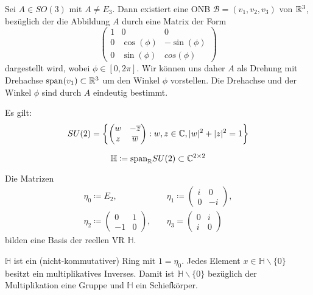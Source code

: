 \documentclass{cheat-sheet}
\newcommand{\HH}{\mathbb{H}}
\newcommand{\BB}{\mathcal{B}}
\begin{document}
\begin{satz}
Sei $A \in SO(3)$ mit $A \not= E_3$. Dann existiert eine ONB $\BB = (v_1, v_2, v_3)$ von $\mathbb{R}^3$, bezüglich der die Abbildung $A$ durch eine Matrix der Form
\[ \begin{pmatrix}
1 & 0 & 0 \\
0 & \cos(\phi) & - \sin(\phi) \\
0 & \sin(\phi) & cos(\phi)
\end{pmatrix} \]
dargestellt wird, wobei $\phi \in [0, 2 \pi]$. Wir können uns daher $A$ als Drehung mit Drehachse $\mathrm{span}(v_1) \subset \mathbb{R}^3$ um den Winkel $\phi$ vorstellen. Die Drehachse und der Winkel $\phi$ sind durch $A$ eindeutig bestimmt.
\end{satz}


\begin{satz}
Es gilt:
\[ SU(2) = \left\{ \begin{pmatrix}
w & - \overline{z} \\
z & \overline{w}
\end{pmatrix} : w, z \in \mathbb{C}, |w|^2 + |z|^2 = 1 \right\} \]
\end{satz}

\begin{definition}
\[ \HH \coloneqq \mathrm{span}_{\R} SU(2) \subset \C^{2 \times 2} \]
\end{definition}

\begin{satz}
Die Matrizen
\begin{align*}
\eta_0 \coloneqq E_2, \quad & \eta_1 \coloneqq \begin{pmatrix} i & 0 \\ 0 & -i \end{pmatrix}, \\
\eta_2 \coloneqq \begin{pmatrix} 0 & 1 \\ -1 & 0 \end{pmatrix}, \quad & \eta_3 = \begin{pmatrix} 0 & i \\ i & 0 \end{pmatrix}
\end{align*}
bilden eine Basis der reellen VR $\mathbb{H}$.
\end{satz}

\begin{satz}
$\HH$ ist ein (nicht-kommutativer) Ring mit $1 = \eta_0$. Jedes Element $x \in \HH \backslash \{ 0 \}$ besitzt ein multiplikatives Inverses. Damit ist $\HH \backslash \{ 0 \}$ bezüglich der Multiplikation eine Gruppe und $\HH$ ein Schiefkörper.
\end{satz}
\end{document}

